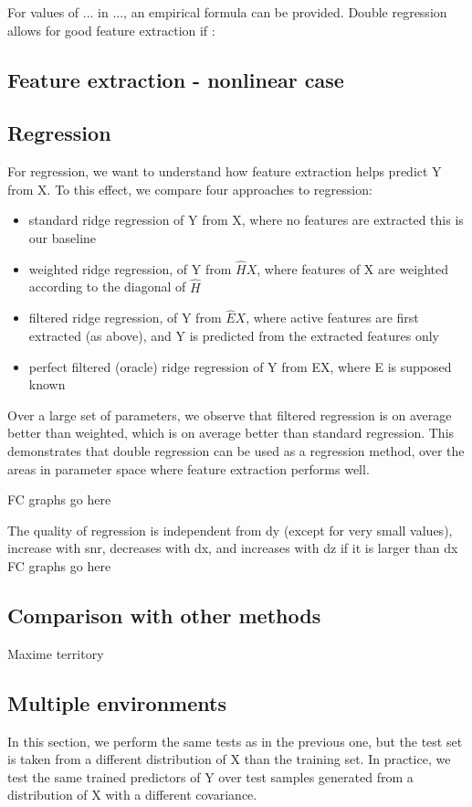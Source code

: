 \documentclass{article}
\begin{document}
For values of ... in ..., an empirical formula can be provided. Double regression allows for good feature extraction if : 

\subsection{Feature extraction - nonlinear case}


\subsection{Regression }
For regression, we want to understand how feature extraction helps predict Y from X. To this effect, we compare four approaches to regression:
\begin{itemize}
\item standard ridge regression of Y from X, where no features are extracted this is our baseline
\item weighted ridge regression, of Y from $\hat H X$, where features of X are weighted according to the diagonal of $\hat H$
\item filtered ridge regression, of Y from $\hat E X$, where active features are first extracted (as above), and Y is predicted from the extracted features only  
\item perfect filtered (oracle) ridge regression of Y from EX, where E is supposed known 
\end{itemize}
Over a large set of parameters, we observe that filtered regression is on average better than weighted, which is on average better than standard regression. This demonstrates that double regression can be used as a regression method, over the areas in parameter space where feature extraction performs well.

FC graphs go here

The quality of regression is independent from dy (except for very small values), increase with snr, decreases with dx, and increases with dz if it is larger than dx 
FC graphs go here

\subsection{Comparison with other methods}
Maxime territory

\subsection{Multiple environments}
In this section, we perform the same tests as in the previous one, but the test set is taken from a different distribution of X than the training set. In practice, we test the same trained predictors of Y over test samples generated from a distribution of X with a different covariance.
\end{document}
